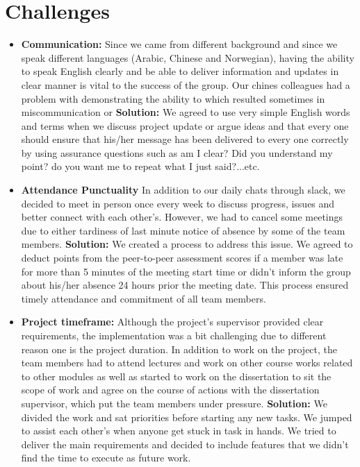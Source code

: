 \documentclass{article}
\begin{document}
\section{Challenges}
\begin{itemize}
\item \textbf{Communication:} Since we came from different background and since we speak different languages (Arabic, Chinese and Norwegian), having the ability to speak English clearly and be able to deliver information and updates in clear manner is vital to the success of the group. Our chines colleagues had a problem with demonstrating the ability to which resulted sometimes in miscommunication or \textbf{Solution:} We agreed to use very simple English words and terms when we discuss project update or argue ideas and that every one should ensure that his/her message has been delivered to every one correctly by using assurance questions such as am I clear? Did you understand my point? do you want me to repeat what I just said?...etc.

\item \textbf{Attendance Punctuality} In addition to our daily chats through slack, we decided to meet in person once every week to discuss progress, issues and better connect with each other’s. However, we had to cancel some meetings due to either tardiness of last minute notice of absence by some of the team members.
\textbf{Solution:} We created a process to address this issue. We agreed to deduct points from the peer-to-peer assessment scores if a member was late for more than 5 minutes of the meeting start time or didn’t inform the group about his/her absence 24 hours prior the meeting date. This process ensured timely attendance and commitment of all team members.
\item \textbf{Project timeframe:} Although the project’s supervisor provided clear requirements, the implementation was a bit challenging due to different reason one is the project duration. In addition to work on the project, the team members had to attend lectures and work on other course works related to other modules as well as started to work on the dissertation to sit the scope of work and agree on the course of actions with the dissertation supervisor, which put the team members under pressure.
\textbf{Solution:} We divided the work and sat priorities before starting any new tasks. We jumped to assist each other’s when anyone get stuck in task in hands. We tried to deliver the main requirements and decided to include features that we didn’t find the time to execute as future work.
\end{itemize}
\end{document}

